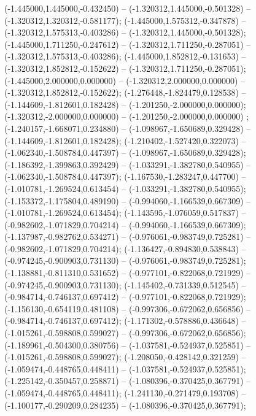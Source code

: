  (-1.445000,1.445000,-0.432450) -- (-1.320312,1.445000,-0.501328) -- (-1.320312,1.320312,-0.581177);
 (-1.445000,1.575312,-0.347878) -- (-1.320312,1.575313,-0.403286) -- (-1.320312,1.445000,-0.501328);
 (-1.445000,1.711250,-0.247612) -- (-1.320312,1.711250,-0.287051) -- (-1.320312,1.575313,-0.403286);
 (-1.445000,1.852812,-0.131653) -- (-1.320312,1.852812,-0.152622) -- (-1.320312,1.711250,-0.287051);
 (-1.445000,2.000000,0.000000) -- (-1.320312,2.000000,0.000000) -- (-1.320312,1.852812,-0.152622);
 (-1.276448,-1.824479,0.128538) -- (-1.144609,-1.812601,0.182428) -- (-1.201250,-2.000000,0.000000);
 (-1.320312,-2.000000,0.000000) -- (-1.201250,-2.000000,0.000000) ;
 (-1.240157,-1.668071,0.234880) -- (-1.098967,-1.650689,0.329428) -- (-1.144609,-1.812601,0.182428);
 (-1.210402,-1.527420,0.322073) -- (-1.062340,-1.508784,0.447397) -- (-1.098967,-1.650689,0.329428);
 (-1.186392,-1.399863,0.392429) -- (-1.033291,-1.382780,0.540955) -- (-1.062340,-1.508784,0.447397);
 (-1.167530,-1.283247,0.447700) -- (-1.010781,-1.269524,0.613454) -- (-1.033291,-1.382780,0.540955);
 (-1.153372,-1.175804,0.489190) -- (-0.994060,-1.166539,0.667309) -- (-1.010781,-1.269524,0.613454);
 (-1.143595,-1.076059,0.517837) -- (-0.982602,-1.071829,0.704214) -- (-0.994060,-1.166539,0.667309);
 (-1.137987,-0.982762,0.534271) -- (-0.976061,-0.983749,0.725281) -- (-0.982602,-1.071829,0.704214);
 (-1.136427,-0.894830,0.538843) -- (-0.974245,-0.900903,0.731130) -- (-0.976061,-0.983749,0.725281);
 (-1.138881,-0.811310,0.531652) -- (-0.977101,-0.822068,0.721929) -- (-0.974245,-0.900903,0.731130);
 (-1.145402,-0.731339,0.512545) -- (-0.984714,-0.746137,0.697412) -- (-0.977101,-0.822068,0.721929);
 (-1.156130,-0.654119,0.481108) -- (-0.997306,-0.672062,0.656856) -- (-0.984714,-0.746137,0.697412);
 (-1.171302,-0.578886,0.436648) -- (-1.015261,-0.598808,0.599027) -- (-0.997306,-0.672062,0.656856);
 (-1.189961,-0.504300,0.380756) -- (-1.037581,-0.524937,0.525851) -- (-1.015261,-0.598808,0.599027);
 (-1.208050,-0.428142,0.321259) -- (-1.059474,-0.448765,0.448411) -- (-1.037581,-0.524937,0.525851);
 (-1.225142,-0.350457,0.258871) -- (-1.080396,-0.370425,0.367791) -- (-1.059474,-0.448765,0.448411);
 (-1.241130,-0.271479,0.193708) -- (-1.100177,-0.290209,0.284235) -- (-1.080396,-0.370425,0.367791);
